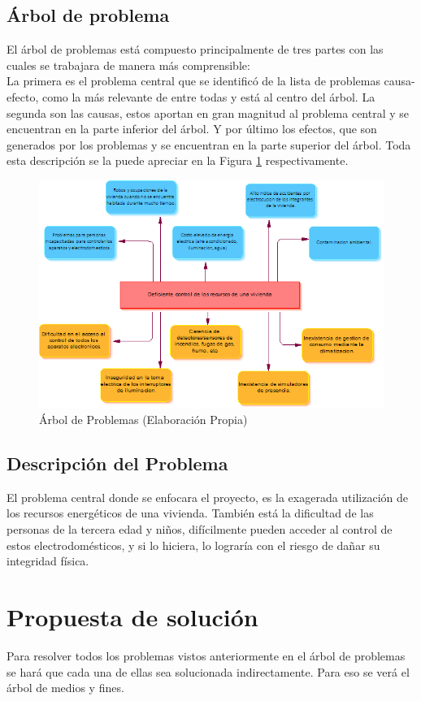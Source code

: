 \documentclass[11pt,letterpaper]{report}
\begin{document}
		\subsection{Árbol de problema}
		El árbol de problemas está compuesto principalmente de tres partes con las cuales se trabajara de manera más comprensible:\\
La primera es el problema central que se identificó de la lista de problemas causa-efecto, como la más relevante de entre todas y está al centro del árbol. La segunda son las causas, estos aportan en gran magnitud al problema central y se encuentran en la parte inferior del árbol. Y por último los efectos, que  son generados por los problemas y se encuentran en la parte superior del árbol. Toda esta descripción se la puede apreciar en la Figura \ref{arbolProblema} respectivamente.
		\begin{figure}[ht]
			\centering
			\includegraphics[width=0.9\linewidth]{imagenes/ap.png}
			\caption{Árbol de Problemas (Elaboración Propia)}
			\label{arbolProblema} 
		\end{figure}
		\subsection{Descripción del Problema}
		El problema central donde se enfocara el proyecto, es la exagerada utilización de los recursos energéticos de una vivienda. También está la dificultad de las personas de la tercera edad y niños, difícilmente pueden acceder al control de estos electrodomésticos, y si lo hiciera, lo lograría con el riesgo de dañar su integridad física.

	\section{Propuesta de solución}
	Para resolver todos los problemas  vistos anteriormente en el árbol de problemas se hará que cada una de ellas sea solucionada indirectamente. Para eso se verá el árbol de medios y fines.
	
\end{document}
